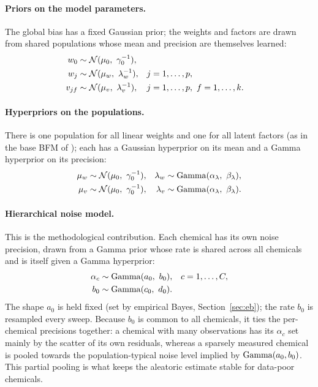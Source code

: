 \paragraph{Priors on the model parameters.} The global bias has a fixed Gaussian
prior; the weights and factors are drawn from shared populations whose mean and
precision are themselves learned:
\begin{align}
  w_0     &\sim \mathcal{N}(\mu_0,\ \gamma_0^{-1}), \\
  w_j     &\sim \mathcal{N}(\mu_w,\ \lambda_w^{-1}), & j&=1,\dots,p, \label{eq:prior-w}\\
  v_{jf}  &\sim \mathcal{N}(\mu_v,\ \lambda_v^{-1}), & j&=1,\dots,p,\ f=1,\dots,k. \label{eq:prior-v}
\end{align}

\paragraph{Hyperpriors on the populations.} There is one population for all
linear weights and one for all latent factors (as in the base BFM of
\citet{rendle2011bayesian}); each has a Gaussian hyperprior on its mean and a
Gamma hyperprior on its precision:
\begin{align}
  \mu_w &\sim \mathcal{N}(\mu_0,\ \gamma_0^{-1}), & \lambda_w &\sim \mathrm{Gamma}(\alpha_\lambda,\ \beta_\lambda), \\
  \mu_v &\sim \mathcal{N}(\mu_0,\ \gamma_0^{-1}), & \lambda_v &\sim \mathrm{Gamma}(\alpha_\lambda,\ \beta_\lambda).
\end{align}

\paragraph{Hierarchical noise model.} This is the methodological contribution.
Each chemical has its own noise precision, drawn from a Gamma prior whose rate is
shared across all chemicals and is itself given a Gamma hyperprior:
\begin{align}
  \alpha_c &\sim \mathrm{Gamma}(a_0,\ b_0), & c&=1,\dots,C, \label{eq:prior-alpha}\\
  b_0      &\sim \mathrm{Gamma}(c_0,\ d_0). \label{eq:prior-b0}
\end{align}
The shape $a_0$ is held fixed (set by empirical Bayes, Section~\ref{sec:eb});
the rate $b_0$ is resampled every sweep. Because $b_0$ is common to all
chemicals, it ties the per-chemical precisions together: a chemical with many
observations has its $\alpha_c$ set mainly by the scatter of its own residuals,
whereas a sparsely measured chemical is pooled towards the population-typical
noise level implied by $\mathrm{Gamma}(a_0,b_0)$. This partial pooling is what keeps the
aleatoric estimate stable for data-poor chemicals.

